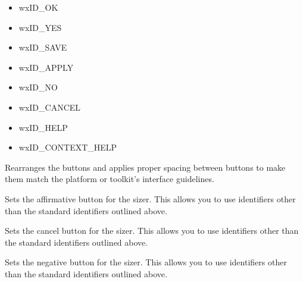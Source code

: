 \begin{itemize}\itemsep=0pt
\item wxID\_OK
\item wxID\_YES
\item wxID\_SAVE
\item wxID\_APPLY
\item wxID\_NO
\item wxID\_CANCEL
\item wxID\_HELP
\item wxID\_CONTEXT\_HELP
\end{itemize}

\label{wxstddialogbuttonsizerrealize}


Rearranges the buttons and applies proper spacing between buttons to make them match the platform or toolkit's interface guidelines.

\label{wxstddialogbuttonsizersetaffirmativebutton}


Sets the affirmative button for the sizer. This allows you to use identifiers other than the standard identifiers outlined above.

\label{wxstddialogbuttonsizersetcancelbutton}


Sets the cancel button for the sizer. This allows you to use identifiers other than the standard identifiers outlined above.

\label{wxstddialogbuttonsizersetnegativebutton}


Sets the negative button for the sizer. This allows you to use identifiers other than the standard identifiers outlined above.

